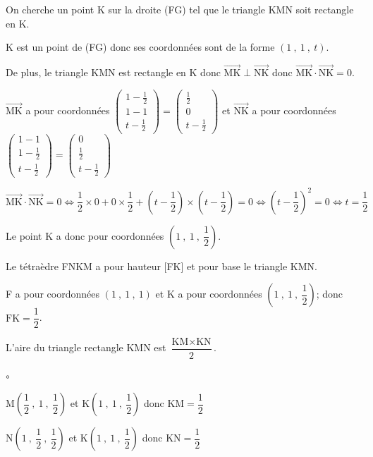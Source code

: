 \documentclass[10pt]{article}
\providecommand{\vectt}[1]{\overrightarrow{\mathrm{#1}}}
\begin{document}
\begin{enumerate}
On cherche un point K sur la droite (FG) tel que le triangle KMN soit rectangle en K.

K est un point de (FG) donc ses coordonnées sont de la forme $\left (1~,~1~,~t\right )$.

De plus, le triangle KMN est rectangle en K donc $\vectt{MK}\perp\vectt{NK}$ donc $\vectt{MK}\cdot\vectt{NK}=0$.

$\vectt{MK}$ a pour coordonnées
$\begin{pmatrix}
1-\frac{1}{2}\\1-1\\t-\frac{1}{2}
\end{pmatrix}
=
\begin{pmatrix}
\frac{1}{2}\\0\\t-\frac{1}{2}
\end{pmatrix}$
et
$\vectt{NK}$ a pour coordonnées
$\begin{pmatrix}
1-1\\1-\frac{1}{2}\\t-\frac{1}{2}
\end{pmatrix}
=
\begin{pmatrix}
0\\\frac{1}{2}\\t-\frac{1}{2}
\end{pmatrix}$

$\vectt{MK}\cdot\vectt{NK}=0
\iff \dfrac{1}{2}\times 0 + 0\times \dfrac{1}{2} + \left (t-\dfrac{1}{2}\right )\times \left (t-\dfrac{1}{2}\right ) = 0
\iff \left (t-\dfrac{1}{2}\right )^2=0
\iff t=\dfrac{1}{2}$

Le point K a donc pour coordonnées $\left (1~,~1~,~\dfrac{1}{2} \right )$.

\item 
Le tétraèdre FNKM a pour hauteur [FK] et pour base le triangle KMN.

\begin{list}{\textbullet}{}
\item F a pour coordonnées $\left (1~,~1~,~1\right )$ et K a pour coordonnées $\left (1~,~1~,~\dfrac{1}{2} \right )$; donc $\text{FK}=\dfrac{1}{2}$.

\item L'aire du triangle rectangle KMN est $\dfrac{\text{KM}\times\text{KN}}{2}$.

\begin{list}{$\circ$}{}
\item M\;$\left (\dfrac{1}{2}~,~1~,~\dfrac{1}{2} \right )$ et K\;$\left (1~,~1~,~\dfrac{1}{2} \right )$ donc $\text{KM}=\dfrac{1}{2}$
\item N\;$\left (1~,~\dfrac{1}{2}~,~\dfrac{1}{2} \right )$ et K\;$\left (1~,~1~,~\dfrac{1}{2} \right )$ donc $\text{KN}=\dfrac{1}{2}$
\end{list}


\end{list}
\end{enumerate}
\end{document}
